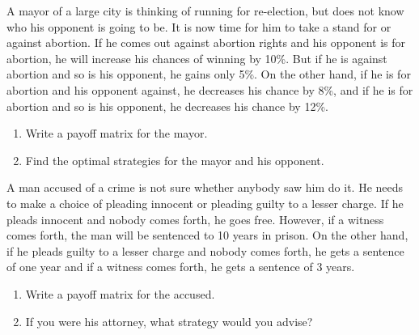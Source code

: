 \begin{puzzle}
    A mayor of a large city is thinking of running for re-election, but does not know who his opponent is going to be. It is now time for him to take a stand for or against abortion. If he comes out against abortion rights and his opponent is for abortion, he will increase his chances of winning by 10\%. But if he is against abortion and so is his opponent, he gains only 5\%. On the other hand, if he is for abortion and his opponent against, he decreases his chance by 8\%, and if he is for abortion and so is his opponent, he decreases his chance by 12\%.
    \begin{enumerate}
        \item Write a payoff matrix for the mayor.
        \item Find the optimal strategies for the mayor and his opponent.
    \end{enumerate}
\end{puzzle}

\begin{puzzle}
    A man accused of a crime is not sure whether anybody saw him do it. He needs to make a choice of pleading innocent or pleading guilty to a lesser charge. If he pleads innocent and nobody comes forth, he goes free. However, if a witness comes forth, the man will be sentenced to 10 years in prison. On the other hand, if he pleads guilty to a lesser charge and nobody comes forth, he gets a sentence of one year and if a witness comes forth, he gets a sentence of 3 years.
    \begin{enumerate}
        \item Write a payoff matrix for the accused.
        \item If you were his attorney, what strategy would you advise?
    \end{enumerate}
\end{puzzle}